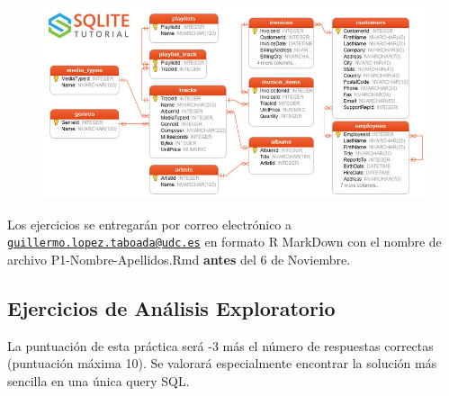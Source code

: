 \documentclass[]{book}
\begin{document}
\begin{figure}
\centering
\includegraphics[width=6.25000in]{images/sqlite-sample-database-color.jpg}
\caption{}
\end{figure}

Los ejercicios se entregarán por correo electrónico a
\href{mailto:guillermo.lopez.taboada@udc.es}{\nolinkurl{guillermo.lopez.taboada@udc.es}}
en formato R MarkDown con el nombre de archivo P1-Nombre-Apellidos.Rmd
\textbf{antes} del 6 de Noviembre.

\subsection{Ejercicios de Análisis
Exploratorio}\label{ejercicios-de-analisis-exploratorio}

La puntuación de esta práctica será -3 más el número de respuestas
correctas (puntuación máxima 10). Se valorará especialmente encontrar la
solución más sencilla en una única query SQL.
\end{document}
